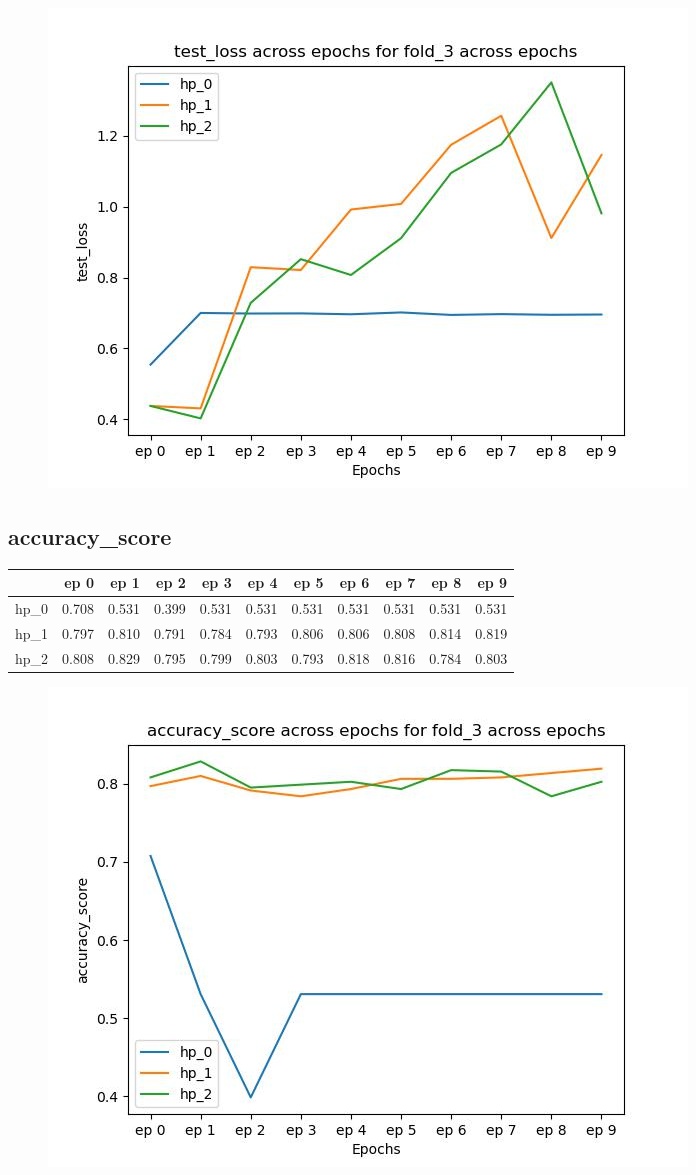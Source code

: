 \documentclass{article}
\begin{document}
\begin{figure}[H]
\includegraphics[scale = 0.75]{fold_3/test_loss}
\end{figure}
\subsection{accuracy\_score}
\begin{tabular}{lrrrrrrrrrr}
\toprule
{} &   ep 0 &   ep 1 &   ep 2 &   ep 3 &   ep 4 &   ep 5 &   ep 6 &   ep 7 &   ep 8 &   ep 9 \\
\midrule
hp\_0 &  0.708 &  0.531 &  0.399 &  0.531 &  0.531 &  0.531 &  0.531 &  0.531 &  0.531 &  0.531 \\
hp\_1 &  0.797 &  0.810 &  0.791 &  0.784 &  0.793 &  0.806 &  0.806 &  0.808 &  0.814 &  0.819 \\
hp\_2 &  0.808 &  0.829 &  0.795 &  0.799 &  0.803 &  0.793 &  0.818 &  0.816 &  0.784 &  0.803 \\
\bottomrule
\end{tabular}

\begin{figure}[H]
\includegraphics[scale = 0.75]{fold_3/accuracy_score}
\end{figure}
\end{document}
